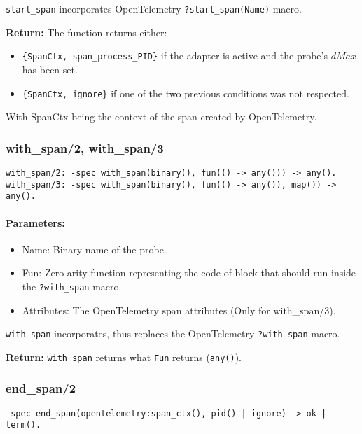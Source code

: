         \texttt{start\_span} incorporates OpenTelemetry \texttt{?start\_span(Name)} macro.
        
        \textbf{Return:} 
        The function returns either:
        \begin{itemize}
            \item  \texttt{\{SpanCtx, span\_process\_PID\}} if the adapter is active and the probe's $dMax$ has been set.
            \item \texttt{\{SpanCtx, ignore\}} if one of the two previous conditions was not respected.
        \end{itemize}
        With SpanCtx being the context of the span created by OpenTelemetry.
        
        \subsubsection{with\_span/2, with\_span/3}
        
        \begin{verbatim}
with_span/2: -spec with_span(binary(), fun(() -> any())) -> any().
with_span/3: -spec with_span(binary(), fun(() -> any()), map()) -> any().
        \end{verbatim}
         
        \paragraph{Parameters:}
            \begin{itemize}
                \item Name: Binary name of the probe.
                \item Fun: Zero-arity function representing the code of block that should run inside the \texttt{?with\_span} macro.
                \item Attributes: The OpenTelemetry span attributes (Only for with\_span/3).

            \end{itemize}

        \texttt{with\_span} incorporates, thus replaces the OpenTelemetry \texttt{?with\_span} macro.

        \textbf{Return:}
            \texttt{with\_span} returns what \texttt{Fun} returns (\texttt{any()}).
        
        \subsubsection{end\_span/2}
            \begin{verbatim}                
-spec end_span(opentelemetry:span_ctx(), pid() | ignore) -> ok | term().
            \end{verbatim}
